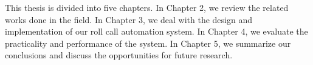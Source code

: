 This thesis is divided into five chapters.
In Chapter 2, we review the related works done in the field.
In Chapter 3, we deal with the design and implementation of our roll call automation system.
In Chapter 4, we evaluate the practicality and performance of the system.
In Chapter 5, we summarize our conclusions and discuss the opportunities for future research.
